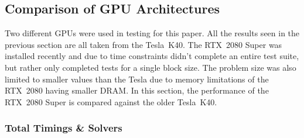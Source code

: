 \subsection{Comparison of GPU Architectures}

Two different GPUs were used in testing for this paper. All the results seen in the previous section are all taken from the Tesla~K40. The RTX~2080 Super was installed recently and due to time constraints didn't complete an entire test suite, but rather only completed tests for a single block size. The problem size was also limited to smaller values than the Tesla due to memory limitations of the RTX~2080 having smaller DRAM. In this section, the performance of the RTX~2080 Super is compared against the older Tesla~K40.

\subsubsection{Total Timings \& Solvers}


